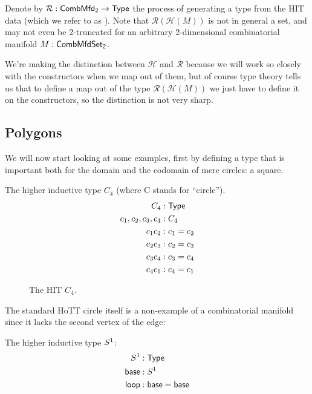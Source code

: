 \begin{mydef}
Denote by \( \mathcal{R}:\mathsf{CombMfd_2}\to\mathsf{Type} \) the process of generating a type from the HIT data (which we refer to as ). Note that \( \mathcal{R}(\mathcal{H}(M)) \) is not in general a set, and may not even be 2-truncated for an arbitrary 2-dimensional combinatorial manifold \( M:\mathsf{CombMfdSet_2} \).
\end{mydef}

We're making the distinction between \( \mathcal{H} \) and \( \mathcal{R} \) because we will work so closely with the constructors when we map out of them, but of course type theory tells us that to define a map out of the type \( \mathcal{R}(\mathcal{H}(M)) \) we just have to define it on the constructors, so the distinction is not very sharp.

\subsection{Polygons}\label{sec:polygons}

We will now start looking at some examples, first by defining a type that is important both for the domain and the codomain of mere circles: a square.

\begin{mydef}
The higher inductive type \( C_4 \) (where C stands for ``circle'').
\begin{align*}
C_4 &: \mathsf{Type} \\
c_1, c_2, c_3, c_4 &: C_4 \\
c_1c_2 &: c_1 = c_2 \\
c_2c_3 &: c_2 = c_3 \\
c_3c_4 &: c_3 = c_4 \\
c_4c_1 &: c_4 = c_1 \\
\end{align*}
\end{mydef}

\begin{figure}[htbp]
\centering

\caption{The HIT \( C_4 \).}
\end{figure}

The standard HoTT circle itself is a non-example of a combinatorial manifold since it lacks the second vertex of the edge:

\begin{mydef}
The higher inductive type \( S^1 \):
\begin{align*}
S^1 &:\mathsf{Type} \\
\mathsf{base}&:S^1 \\
\mathsf{loop}&:\mathsf{base}=\mathsf{base}
\end{align*}
\end{mydef}

